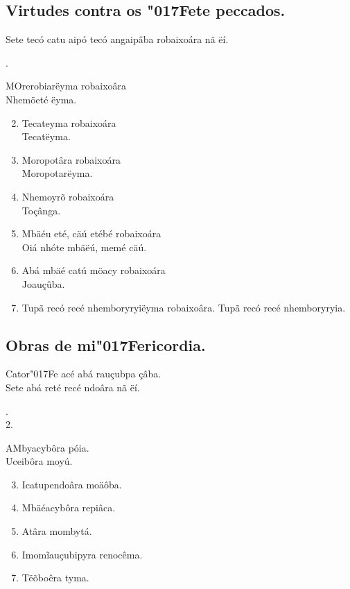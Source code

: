 \documentclass[openany,titlepage,12pt]{book}
\newcommand{\lgS}{\char"017F}
\newcommand{\comecalista}[5]{
    \hspace*{-11.7pt}
    \begin{minipage}[t]{0.08\linewidth}
        \flushright #1\\#2
    \end{minipage}
    \hspace{0pt}
    \begin{minipage}[t]{0.94\linewidth}
        \lettrine
        [findent =2pt, nindent=0pt,  lines=2]
        {#3}{#4}#5
    \end{minipage}
    \vspace*{-3pt}
}
\begin{document}
\subsection{Virtudes contra os \lgS ete peccados.}
\begin{center}
    Sete tecó catu aipó tecó angaipâba robaixoára nã ëí.  
\end{center}
\comecalista{1.}{}{M}{O}
    {rerobiarëyma robaixoâra\\\hspace*{10pt} Nhemöeté ëyma.}
\begin{enumerate}
    \setcounter{enumi}{1}
    \item Tecateyma robaixoára\\\hspace*{40pt} Tecatëyma.
    \item Moropotâra robaixoára\\\hspace*{40pt} Moropotarëyma.
    \item Nhemoyrõ robaixoára\\\hspace*{40pt} Toçânga.
    \item Mbäéu eté, cäú etébé robaixoára\\
    \hspace*{40pt} Oiá nhóte mbäëú, memé cäú.
    \item Abá mbäé catú möacy robaixoára\\\hspace*{40pt}
    Joauçûba.
    \item Tupã recó recé nhemboryryiëyma robaixoâra. Tupã
    recó recé nhemboryryia.
\end{enumerate}

\subsection{Obras de mi\lgS ericordia.}
\begin{center}
    Cator\lgS e acé abá rauçubpa çâba.\\
    Sete abá reté recé ndoâra nã ëí.
\end{center}
\comecalista{1.}{2.}{A}{M}
    {byacybôra póia.\\Uceibôra moyú.}
\begin{enumerate}
    \setcounter{enumi}{2}
    \item Icatupendoâra moäôba.
    \item Mbäéacybôra repiâca.
    \item Atâra mombytá.
    \item Imomĩauçubipyra renocêma.
    \item Tëõboêra tyma.
\end{enumerate}
\end{document}
